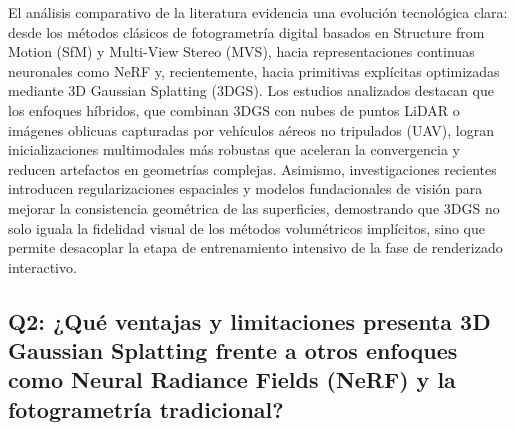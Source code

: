 \documentclass[12pt,oneside]{report}
\begin{document}
El análisis comparativo de la literatura evidencia una evolución tecnológica clara: desde los métodos clásicos de fotogrametría digital basados en Structure from Motion (SfM) y Multi-View Stereo (MVS), hacia representaciones continuas neuronales como NeRF y, recientemente, hacia primitivas explícitas optimizadas mediante 3D Gaussian Splatting (3DGS). Los estudios analizados destacan que los enfoques híbridos, que combinan 3DGS con nubes de puntos LiDAR o imágenes oblicuas capturadas por vehículos aéreos no tripulados (UAV), logran inicializaciones multimodales más robustas que aceleran la convergencia y reducen artefactos en geometrías complejas. Asimismo, investigaciones recientes introducen regularizaciones espaciales y modelos fundacionales de visión para mejorar la consistencia geométrica de las superficies, demostrando que 3DGS no solo iguala la fidelidad visual de los métodos volumétricos implícitos, sino que permite desacoplar la etapa de entrenamiento intensivo de la fase de renderizado interactivo.\par

\subsection{Q2: ¿Qué ventajas y limitaciones presenta 3D Gaussian Splatting frente a otros enfoques como Neural Radiance Fields (NeRF) y la fotogrametría tradicional?}
\end{document}
